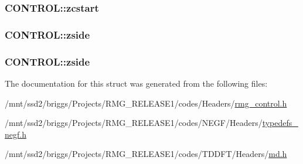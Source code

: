 \hypertarget{struct_c_o_n_t_r_o_l_a861a900beff8b536890214575b304590}{
\subsubsection[{zcstart}]{ C\-O\-N\-T\-R\-O\-L\-::zcstart}}\label{struct_c_o_n_t_r_o_l_a861a900beff8b536890214575b304590}
\hypertarget{struct_c_o_n_t_r_o_l_ab343d75fc49fe56db6a8237a58264d8c}{
\subsubsection[{zside}]{ C\-O\-N\-T\-R\-O\-L\-::zside}}\label{struct_c_o_n_t_r_o_l_ab343d75fc49fe56db6a8237a58264d8c}
\hypertarget{struct_c_o_n_t_r_o_l_a0edd8dbabda1d1f18d42d27c48918846}{
\subsubsection[{zside}]{ C\-O\-N\-T\-R\-O\-L\-::zside}}\label{struct_c_o_n_t_r_o_l_a0edd8dbabda1d1f18d42d27c48918846}


The documentation for this struct was generated from the following files\-:\begin{DoxyCompactItemize}
\item 
/mnt/ssd2/briggs/\-Projects/\-R\-M\-G\-\_\-\-R\-E\-L\-E\-A\-S\-E1/codes/\-Headers/\hyperlink{rmg__control_8h}{rmg\-\_\-control.\-h}\item 
/mnt/ssd2/briggs/\-Projects/\-R\-M\-G\-\_\-\-R\-E\-L\-E\-A\-S\-E1/codes/\-N\-E\-G\-F/\-Headers/\hyperlink{typedefs__negf_8h}{typedefs\-\_\-negf.\-h}\item 
/mnt/ssd2/briggs/\-Projects/\-R\-M\-G\-\_\-\-R\-E\-L\-E\-A\-S\-E1/codes/\-T\-D\-D\-F\-T/\-Headers/\hyperlink{md_8h}{md.\-h}\end{DoxyCompactItemize}
